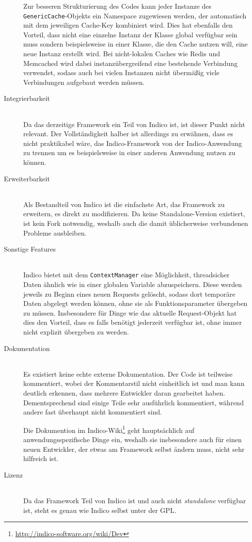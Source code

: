 \begin{description}
Zur besseren Strukturierung des Codes kann jeder Instanze des \lstinline{GenericCache}-Objekts ein
Namespace zugewiesen werden, der automatisch mit dem jeweiligen Cache-Key kombiniert wird. Dies hat
ebenfalls den Vorteil, dass nicht eine einzelne Instanz der Klasse global verfügbar sein muss
sondern beispielsweise in einer Klasse, die den Cache nutzen will, eine neue Instanz erstellt wird.
Bei nicht-lokalen Caches wie Redis und Memcached wird dabei instanzübergreifend eine bestehende
Verbindung verwendet, sodass auch bei vielen Instanzen nicht übermäßig viele Verbindungen aufgebaut
werden müssen.


\item[Integrierbarkeit] \hfill \\
Da das derzeitige Framework ein Teil von Indico ist, ist dieser Punkt nicht relevant. Der
Vollständigkeit halber ist allerdings zu erwähnen, dass es nicht praktikabel wäre, das
Indico-Framework von der Indico-Anwendung zu trennen um es beispielsweise in einer anderen Anwendung
nutzen zu können.


\item[Erweiterbarkeit] \hfill \\
Als Bestandteil von Indico ist die einfachste Art, das Framework zu erweitern, es direkt zu
modifizieren. Da keine Standalone-Version existiert, ist kein Fork notwendig, weshalb auch die damit
üblicherweise verbundenen Probleme ausbleiben.


\item[Sonstige Features] \hfill \\
Indico bietet mit dem \lstinline{ContextManager} eine Möglichkeit, threadsicher Daten ähnlich wie in
einer globalen Variable abzuspeichern. Diese werden jeweils zu Beginn eines neuen Requests gelöscht,
sodass dort temporäre Daten abgelegt werden können, ohne sie als Funktionsparameter übergeben zu
müssen. Insbesondere für Dinge wie das aktuelle Request-Objekt hat dies den Vorteil, dass es falls
benötigt jederzeit verfügbar ist, ohne immer nicht explizit übergeben zu werden.


\item[Dokumentation] \hfill \\
Es existiert keine echte externe Dokumentation. Der Code ist teilweise kommentiert, wobei der
Kommentarstil nicht einheitlich ist und man kann deutlich erkennen, dass mehrere Entwickler daran
gearbeitet haben. Dementsprechend sind einige Teile sehr ausführlich kommentiert, während andere
fast überhaupt nicht kommentiert sind.

Die Dokumention im Indico-Wiki\footnote{\href{http://indico-software.org/wiki/Dev}{http://indico-software.org/wiki/Dev}}
geht hauptsächlich auf anwendungsspezifische Dinge ein, weshalb sie insbesondere auch für einen
neuen Entwickler, der etwas am Framework selbst ändern muss, nicht sehr hilfreich ist.


\item[Lizenz] \hfill \\
Da das Framework Teil von Indico ist und auch nicht \emph{standalone} verfügbar ist, steht es genau
wie Indico selbst unter der GPL.

\end{description}

